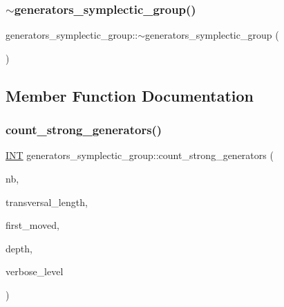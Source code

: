 \subsubsection{\texorpdfstring{$\sim$generators\+\_\+symplectic\+\_\+group()}{~generators\_symplectic\_group()}}
{\footnotesize\ttfamily generators\+\_\+symplectic\+\_\+group\+::$\sim$generators\+\_\+symplectic\+\_\+group (\begin{DoxyParamCaption}{ }\end{DoxyParamCaption})}



\subsection{Member Function Documentation}
\mbox{\label{classgenerators__symplectic__group_adae8eb63b9aac802572e94b144dd27a5}} 
\subsubsection{\texorpdfstring{count\+\_\+strong\+\_\+generators()}{count\_strong\_generators()}}
{\footnotesize\ttfamily \mbox{\hyperlink{galois_8h_a09fddde158a3a20bd2dcadb609de11dc}{I\+NT}} generators\+\_\+symplectic\+\_\+group\+::count\+\_\+strong\+\_\+generators (\begin{DoxyParamCaption}\item[{\mbox{\hyperlink{galois_8h_a09fddde158a3a20bd2dcadb609de11dc}{I\+NT}} \&}]{nb,  }\item[{\mbox{\hyperlink{galois_8h_a09fddde158a3a20bd2dcadb609de11dc}{I\+NT}} $\ast$}]{transversal\+\_\+length,  }\item[{\mbox{\hyperlink{galois_8h_a09fddde158a3a20bd2dcadb609de11dc}{I\+NT}} \&}]{first\+\_\+moved,  }\item[{\mbox{\hyperlink{galois_8h_a09fddde158a3a20bd2dcadb609de11dc}{I\+NT}}}]{depth,  }\item[{\mbox{\hyperlink{galois_8h_a09fddde158a3a20bd2dcadb609de11dc}{I\+NT}}}]{verbose\+\_\+level }\end{DoxyParamCaption})}

\mbox{\label{classgenerators__symplectic__group_a6f665ce37c2870369f4b79abfdbf74be}} 
